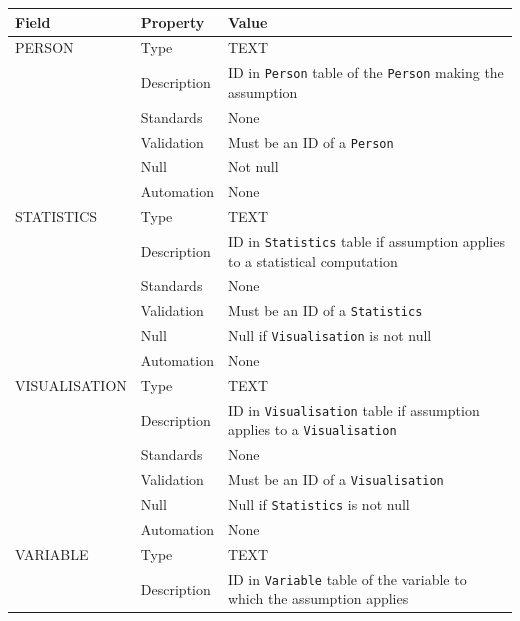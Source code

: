\documentclass[
]{article}
\newcounter{none}
\begin{document}
{\def\LTcaptype{none} 
\begin{longtable}[]{@{}
  >{\raggedright\arraybackslash}p{}
  >{\raggedright\arraybackslash}p{}
  >{\raggedright\arraybackslash}p{}@{}}
\toprule\noalign{}
\begin{minipage}[b]{\linewidth}\raggedright
Field
\end{minipage} & \begin{minipage}[b]{\linewidth}\raggedright
Property
\end{minipage} & \begin{minipage}[b]{\linewidth}\raggedright
Value
\end{minipage} \\
\midrule\noalign{}
\endhead
\bottomrule\noalign{}
\endlastfoot
PERSON & Type & TEXT \\
& Description & ID in \texttt{Person} table of the \texttt{Person}
making the assumption \\
& Standards & None \\
& Validation & Must be an ID of a \texttt{Person} \\
& Null & Not null \\
& Automation & None \\
STATISTICS & Type & TEXT \\
& Description & ID in \texttt{Statistics} table if assumption applies to
a statistical computation \\
& Standards & None \\
& Validation & Must be an ID of a \texttt{Statistics} \\
& Null & Null if \texttt{Visualisation} is not null \\
& Automation & None \\
VISUALISATION & Type & TEXT \\
& Description & ID in \texttt{Visualisation} table if assumption applies
to a \texttt{Visualisation} \\
& Standards & None \\
& Validation & Must be an ID of a \texttt{Visualisation} \\
& Null & Null if \texttt{Statistics} is not null \\
& Automation & None \\
VARIABLE & Type & TEXT \\
& Description & ID in \texttt{Variable} table of the variable to which
the assumption applies \\

\end{longtable}}
\end{document}

